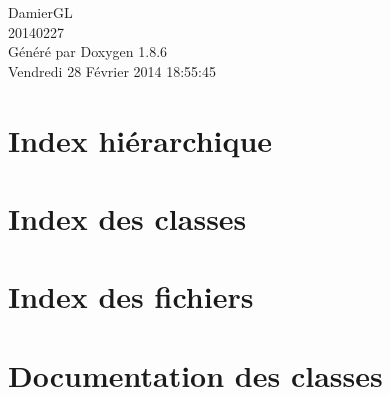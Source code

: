 \documentclass[twoside]{book}
\newcommand{\clearemptydoublepage}{%
  \newpage{\pagestyle{empty}\cleardoublepage}%
}
\begin{document}
\hypersetup{pageanchor=false}
\begin{titlepage}
\vspace*{7cm}
\begin{center}%
{\Large Damier\-G\-L \\[1ex]\large 20140227 }\\
\vspace*{1cm}
{\large Généré par Doxygen 1.8.6}\\
\vspace*{0.5cm}
{\small Vendredi 28 Février 2014 18:55:45}\\
\end{center}
\end{titlepage}
\clearemptydoublepage
\tableofcontents
\clearemptydoublepage
{}
\hypersetup{pageanchor=true}

\chapter{Index hiérarchique}

\chapter{Index des classes}

\chapter{Index des fichiers}

\chapter{Documentation des classes}





















\end{document}
